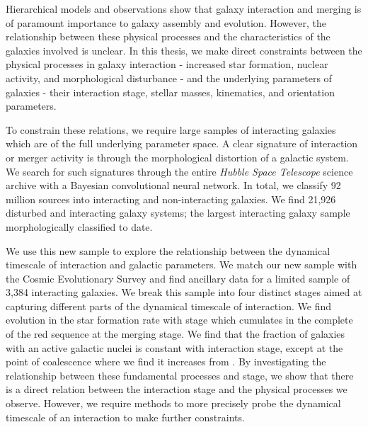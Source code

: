 

\begin{abstracts}        %
Hierarchical models and observations show that galaxy interaction and merging is of paramount importance to galaxy assembly and evolution. However, the relationship between these physical processes and the characteristics of the galaxies involved is unclear. In this thesis, we make direct constraints between the physical processes \DIFdelbegin {}\DIFdelend \DIFaddbegin {}\DIFaddend in galaxy interaction - increased star formation, nuclear activity, and morphological disturbance - and the underlying parameters of galaxies - their interaction stage, stellar masses, kinematics, and orientation parameters. 

To constrain these relations, we require large samples of interacting galaxies which are \DIFdelbegin {}\DIFdelend \DIFaddbegin {}\DIFaddend of the full underlying parameter space. A clear signature of interaction or merger activity is through the morphological distortion of a galactic system. We search for such signatures through the entire \emph{Hubble Space Telescope} science archive with a Bayesian convolutional neural network. In total, we classify 92 million sources into interacting and non-interacting galaxies. We find 21,926 disturbed and interacting galaxy systems; the largest interacting galaxy sample morphologically classified to date. 

We use this new sample to explore the relationship between the dynamical timescale of interaction and galactic parameters. We match our new sample with the Cosmic Evolutionary Survey and find ancillary data for a \DIFdelbegin {}\DIFdelend \DIFaddbegin {}\DIFaddend limited sample of 3,384 interacting galaxies. We break this sample into four distinct stages aimed at capturing different parts of the dynamical timescale of interaction. We find evolution in the star formation rate with stage which cumulates in the complete \DIFdelbegin {}\DIFdelend \DIFaddbegin {}\DIFaddend of the red sequence at the merging stage. We find that the fraction of galaxies with an active galactic nuclei is constant with interaction stage, except at the point of coalescence where we find it increases from \DIFdelbegin {}\DIFdelend \DIFaddbegin {}\DIFaddend . By investigating the relationship between these fundamental processes and stage, we show that there is a direct relation between the interaction stage and the physical processes we observe. However, we require methods to more precisely probe the dynamical timescale of an interaction to make further constraints.


\end{abstracts}

